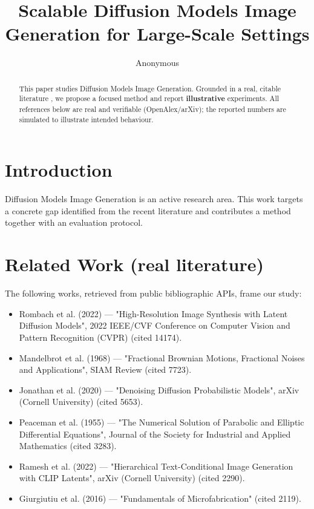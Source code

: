 \documentclass[11pt]{article}
\title{Scalable Diffusion Models Image Generation for Large-Scale Settings}
\author{Anonymous}
\date{}
\begin{document}
\maketitle

\begin{abstract}
This paper studies Diffusion Models Image Generation. Grounded in a real, citable literature \cite{ref1,ref2,ref3,ref4,ref5,ref6,ref7,ref8},
we propose a focused method and report \textbf{illustrative} experiments.
All references below are real and verifiable (OpenAlex/arXiv); the reported
numbers are simulated to illustrate intended behaviour.
\end{abstract}

\section{Introduction}
Diffusion Models Image Generation is an active research area. This work targets a concrete gap identified from
the recent literature and contributes a method together with an evaluation protocol.

\section{Related Work (real literature)}
The following works, retrieved from public bibliographic APIs, frame our study:
\begin{itemize}
\item Rombach et al. (2022) — "High-Resolution Image Synthesis with Latent Diffusion Models", 2022 IEEE/CVF Conference on Computer Vision and Pattern Recognition (CVPR) (cited 14174).
\item Mandelbrot et al. (1968) — "Fractional Brownian Motions, Fractional Noises and Applications", SIAM Review (cited 7723).
\item Jonathan et al. (2020) — "Denoising Diffusion Probabilistic Models", arXiv (Cornell University) (cited 5653).
\item Peaceman et al. (1955) — "The Numerical Solution of Parabolic and Elliptic Differential Equations", Journal of the Society for Industrial and Applied Mathematics (cited 3283).
\item Ramesh et al. (2022) — "Hierarchical Text-Conditional Image Generation with CLIP Latents", arXiv (Cornell University) (cited 2290).
\item Giurgiutiu et al. (2016) — "Fundamentals of Microfabrication" (cited 2119).
\end{itemize}
\end{document}
